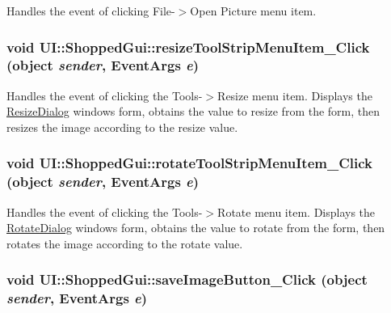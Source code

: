\label{class_u_i_1_1_shopped_gui_a059988dec5a74fcc82ee2eb503d49118}
Handles the event of clicking File-\/$>$Open Picture menu item. \hypertarget{class_u_i_1_1_shopped_gui_a05e2b57477f10f88b1ee06b6b5aa4d86}{
\subsubsection[{resizeToolStripMenuItem\_\-Click}]{\setlength{\rightskip}{0pt plus 5cm}void UI::ShoppedGui::resizeToolStripMenuItem\_\-Click (object {\em sender}, \/  EventArgs {\em e})}}
\label{class_u_i_1_1_shopped_gui_a05e2b57477f10f88b1ee06b6b5aa4d86}
Handles the event of clicking the Tools-\/$>$Resize menu item. Displays the \hyperlink{class_u_i_1_1_resize_dialog}{ResizeDialog} windows form, obtains the value to resize from the form, then resizes the image according to the resize value. \hypertarget{class_u_i_1_1_shopped_gui_a8b4824c0552bcfe814bbf8437cb87ec2}{
\subsubsection[{rotateToolStripMenuItem\_\-Click}]{\setlength{\rightskip}{0pt plus 5cm}void UI::ShoppedGui::rotateToolStripMenuItem\_\-Click (object {\em sender}, \/  EventArgs {\em e})}}
\label{class_u_i_1_1_shopped_gui_a8b4824c0552bcfe814bbf8437cb87ec2}
Handles the event of clicking the Tools-\/$>$Rotate menu item. Displays the \hyperlink{class_u_i_1_1_rotate_dialog}{RotateDialog} windows form, obtains the value to rotate from the form, then rotates the image according to the rotate value. \hypertarget{class_u_i_1_1_shopped_gui_a205444f0fff14792394724b4eb22601d}{
\subsubsection[{saveImageButton\_\-Click}]{\setlength{\rightskip}{0pt plus 5cm}void UI::ShoppedGui::saveImageButton\_\-Click (object {\em sender}, \/  EventArgs {\em e})}}
